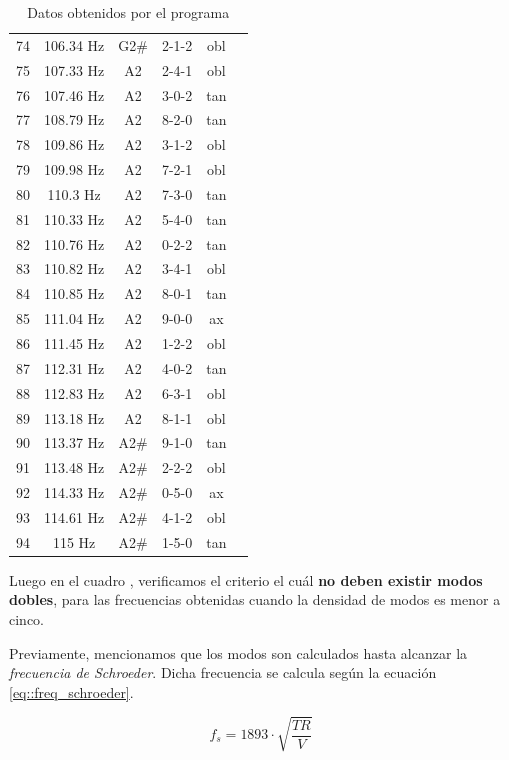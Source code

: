 \begin{table}[H]
\begin{tabular}{|c|c|c|c|c|c|}
74&106.34 Hz&G2\#&2-1-2&obl\\
75&107.33 Hz&A2&2-4-1&obl\\
76&107.46 Hz&A2&3-0-2&tan\\
77&108.79 Hz&A2&8-2-0&tan\\
78&109.86 Hz&A2&3-1-2&obl\\
79&109.98 Hz&A2&7-2-1&obl\\
80&110.3 Hz&A2&7-3-0&tan\\
81&110.33 Hz&A2&5-4-0&tan\\
82&110.76 Hz&A2&0-2-2&tan\\
83&110.82 Hz&A2&3-4-1&obl\\
84&110.85 Hz&A2&8-0-1&tan\\
85&111.04 Hz&A2&9-0-0&ax\\
86&111.45 Hz&A2&1-2-2&obl\\
87&112.31 Hz&A2&4-0-2&tan\\
88&112.83 Hz&A2&6-3-1&obl\\
89&113.18 Hz&A2&8-1-1&obl\\
90&113.37 Hz&A2\#&9-1-0&tan\\
91&113.48 Hz&A2\#&2-2-2&obl\\
92&114.33 Hz&A2\#&0-5-0&ax\\
93&114.61 Hz&A2\#&4-1-2&obl\\
94&115 Hz&A2\#&1-5-0&tan\\
\hline
    \end{tabular}
    \caption{Datos obtenidos por el programa}
    \label{tab:datos_obtenidos_programa}
\end{table}


\newpage

\par Luego en el cuadro , verificamos el criterio el cuál \textbf{no deben existir modos dobles}, para las frecuencias obtenidas cuando la densidad de modos es menor a cinco.\\


\par Previamente, mencionamos que los modos son calculados hasta alcanzar la \textit{frecuencia de Schroeder}. Dicha frecuencia se calcula según la ecuación \eqref{eq::freq_schroeder}.

\begin{equation}
    \boxed{f_s = 1893 \cdot \sqrt{\frac{TR}{V}}}
    \label{eq::freq_schroeder}
\end{equation}






